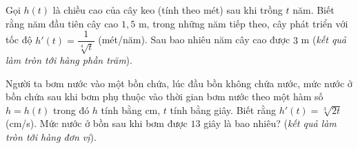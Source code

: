 \begin{ex}
	Gọi $h(t)$ là chiều cao của cây keo (tính theo mét) sau khi trồng $t$ năm. Biết rằng năm đầu tiên cây cao $1{,}5$ m, trong những năm tiếp theo, cây phát triển với tốc độ $h'(t)=\dfrac{1}{\sqrt[4]{t}}$ (mét/năm). Sau bao nhiêu năm cây cao được $3$ m (\textit{kết quả làm tròn tới hàng phần trăm}).
\end{ex}

\begin{ex}%
	Người ta bơm nước vào một bồn chứa, lúc đầu bồn không chứa nước, mức nước ở bồn chứa sau khi bơm phụ thuộc vào thời gian bơm nước theo một hàm số $h=h(t)$ trong đó $h$ tính bằng cm, $t$ tính bằng giây. Biết rằng $h'(t)=\sqrt[3]{2t}$ (cm/s). Mức nước ở bồn sau khi bơm được $13$ giây là bao nhiêu? (\textit{kết quả làm tròn tới hàng đơn vị}).
\end{ex}

